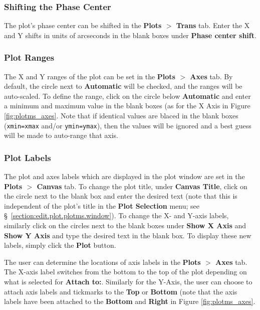 
\subsubsection{Shifting the Phase Center}
\label{section:edit.plot.plotms.phcen}

The plot's phase center can be shifted in the {\bf Plots $>$ Trans} tab. Enter the X and Y shifts in units of arcseconds in the blank boxes under {\bf Phase center shift}.


\subsubsection{Plot Ranges}
\label{section:edit.plot.plotms.range}

The X and Y ranges of the plot can be set in the {\bf Plots $>$ Axes} tab. By default, the circle next to {\bf Automatic} will be checked, and the ranges will be auto-scaled. To define the range, click on the circle below {\bf Automatic} and enter a minimum and maximum value in the blank boxes (as for the X Axis in Figure \ref{fig:plotms_axes}. Note that if identical values are blaced in the blank boxes ({\tt xmin=xmax} and/or {\tt ymin=ymax}), then the values will be ignored and a best guess will be made to auto-range that axis.


\subsubsection{Plot Labels}
\label{section:edit.plot.plotms.labels}

The plot and axes labels which are displayed in the plot window are set in the {\bf Plots $>$ Canvas} tab. To change the plot title, under {\bf Canvas Title}, click on the circle next to the blank box and enter the desired text (note that this is independent of the plot's title in the {\bf Plot Selection} menu; see \S~\ref{section:edit.plot.plotms.window}). To change the X- and Y-axis labels, similarly click on the circles next to the blank boxes under {\bf Show X Axis} and {\bf Show Y Axis} and type the desired text in the blank box. To display these new labels, simply click the {\bf Plot} button.

The user can determine the locations of axis labels in the {\bf Plots $>$ Axes} tab. The X-axis label switches from the bottom to the top of the plot depending on what is selected for {\bf Attach to:}. Similarly for the Y-Axis, the user can choose to attach axis labels and tickmarks to the {\bf Top} or {\bf Bottom} (note that the axis labels have been attached to the {\bf Bottom} and {\bf Right} in Figure \ref{fig:plotms_axes}.

